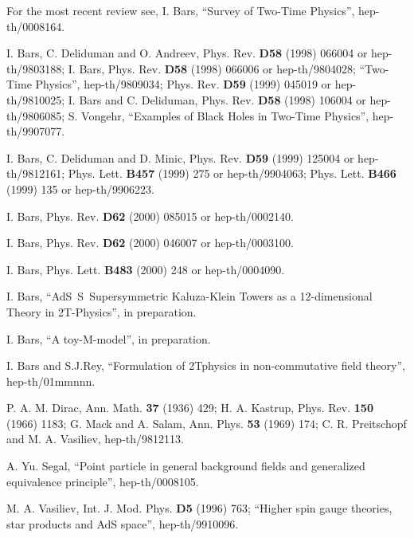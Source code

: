 \documentclass[a4paper,12pt]{article}
\begin{document}
\begin{thebibliography}{99}
  For the most recent review see, I. Bars, ``Survey of
Two-Time Physics'', hep-th/0008164.

  I. Bars, C. Deliduman and O. Andreev, Phys. Rev. \textbf{D58}
(1998) 066004 or hep-th/9803188; \newline
I. Bars, Phys. Rev. \textbf{D58} (1998) 066006 or hep-th/9804028; ``Two-Time
Physics'', hep-th/9809034; Phys. Rev. \textbf{D59} (1999) 045019 or
hep-th/9810025; \newline
I. Bars and C. Deliduman, Phys. Rev. \textbf{D58} (1998) 106004 or
hep-th/9806085;\newline
S. Vongehr, ``Examples of Black Holes in Two-Time Physics'', hep-th/9907077.

  I. Bars, C. Deliduman and D. Minic, Phys. Rev. \textbf{D59%
} (1999) 125004 or hep-th/9812161; Phys. Lett. \textbf{B457} (1999) 275 or
hep-th/9904063; Phys. Lett. \textbf{B466} (1999) 135 or hep-th/9906223.

  I. Bars, Phys. Rev. \textbf{D62} (2000) 085015 or
hep-th/0002140.

  I. Bars, Phys. Rev. \textbf{D62} (2000) 046007 or
hep-th/0003100.

  I. Bars, Phys. Lett. \textbf{B483} (2000) 248 or
hep-th/0004090.

  I. Bars, ``AdS\coordHE{}\ S\coordHE{}\ Supersymmetric
Kaluza-Klein Towers as a 12-dimensional Theory in 2T-Physics'', in
preparation.

  I. Bars, ``A toy-M-model'', in preparation.

  I. Bars and S.J.Rey, ``Formulation of 2Tphysics in
non-commutative field theory'', hep-th/01mmnnn.

  P. A. M. Dirac, Ann. Math. \textbf{37} (1936) 429;\newline
H. A. Kastrup, Phys. Rev. \textbf{150} (1966) 1183; \newline
G. Mack and A. Salam, Ann. Phys. \textbf{53} (1969) 174; \newline
C. R. Preitschopf and M. A. Vasiliev, hep-th/9812113.

  A. Yu. Segal, ``Point particle in general background fields
and generalized equivalence principle'', hep-th/0008105.

  M. A. Vasiliev, Int. J. Mod. Phys. \textbf{D5 }(1996)
763; ``Higher spin gauge theories, star products and AdS space'',
hep-th/9910096.


\end{thebibliography}
\end{document}
